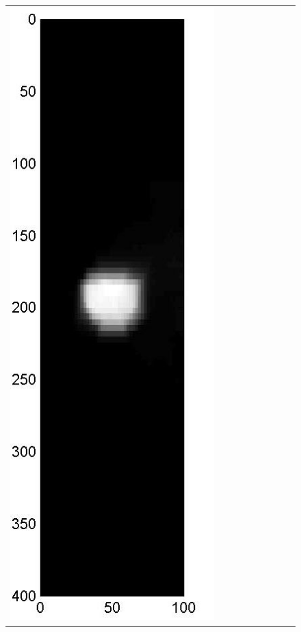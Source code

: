 \documentclass[11pt]{article}
\begin{document}
\begin{figure}[!h]
\begin{center}
\begin{tabular}{|c|c|c|c|c|c|c|c|c|}
			\includegraphics[width=.9\iwidth]{figures/newFigs/noisy/resultsExp-4-mkTV}
			&

\end{tabular}
\end{center}
\end{figure}
\end{document}

